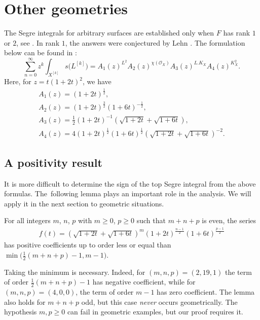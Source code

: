 \section{Other geometries} \label{secother}
The Segre integrals for arbitrary surfaces are established only when $F$ has rank $1$ or $2$, see \cite{MOP1, MOP}. In rank $1$, the answers were conjectured by Lehn \cite{Le}. The formulation below can be found in \cite{MOP}:
\begin{equation}\label{lehnc}
\sum_{n=0}^{\infty} z^k \int_{X^{[k]}} s\big(L^{[k]}\big) = A_1 (z)^{L^2} A_2(z)^{\chi(\mathcal O_X)} A_3 (z)^{L.K_X} A_4(z)^{K_X^2}.
\end{equation}
Here, for $z=t(1+2t)^2$, we have
\begin{gather*}
A_1(z)=(1+2t)^{\frac{1}{2}},
\\
A_2(z)=(1+2t)^{\frac{3}{2}} (1+6t)^{-\frac{1}{2}},
\\
A_3(z)=\frac{1}{2} (1+2t)^{-1} \left(\sqrt{1+2t}+\sqrt{1+6t}\right),
\\
 A_4(z)=4 (1+2t)^{\frac{1}{2}} (1+6t)^{\frac{1}{2}} \left(\sqrt{1+2t}+\sqrt{1+6t}\right)^{-2}.
 \end{gather*}

\subsection{A positivity result} It is more difficult to determine the sign of the top Segre integral from the above formulas. The~following lemma plays an important role in the analysis. We will apply it in the next section to geometric situations.

\begin{Lemma}\label{cl}
For all integers $m$, $n$, $p$ with $m\geq 0$, $p\geq 0$ such that $m+n+p$ is even, the series
\begin{gather*}
f(t)=\left(\sqrt{1+2t}+\sqrt{1+6t}\right)^m {(1+2t)}^{\frac{n-1}{2}} (1+6t)^{\frac{p-1}{2}}
\end{gather*}
has positive coefficients up to order less or equal than $\min\big(\frac{1}{2}(m+n+p)-1, m-1\big)$.
\end{Lemma}
Taking the minimum is necessary. Indeed, for $(m, n, p)=(2, 19, 1)$ the term of order $\frac{1}{2}(m+n+p)-1$ has negative coefficient, while for $(m, n, p)=(4, 0, 0)$, the term of order $m-1$ has zero coefficient. The lemma also holds for $m+n+p$ odd, but this case {\it never} occurs geometrically. The hypothesis $m, p\geq 0$ can fail in geometric examples, but our proof requires it.

